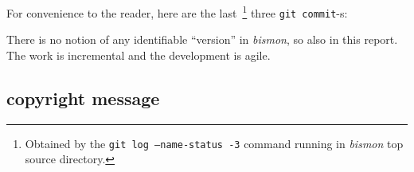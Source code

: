 \documentclass[11pt,a4paper,svgnames]{article}
\begin{document}
\begin{titlepage}
For convenience to the reader, here are the last~\footnote{Obtained by the
  \texttt{git log --name-status -3} command running in \emph{bismon}
  top source directory.} three \texttt{git commit}-s:

\begin{relsize}{-2}
  
\end{relsize}

There is no notion of any identifiable ``version'' in \emph{bismon},
so also in this report. The work is incremental and the development is
agile.

\bigskip


    \smallskip



 \subsection*{copyright message}


\end{titlepage}
\end{document}
